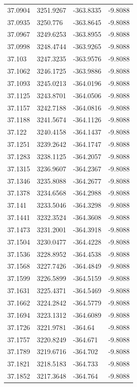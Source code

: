 \begin{table}[H]
\begin{tabular}{llll}
37.0904 & 3251.9267 & -363.8335 & -9.8088 \\
37.0935 & 3250.776 & -363.8645 & -9.8088 \\
37.0967 & 3249.6253 & -363.8955 & -9.8088 \\
37.0998 & 3248.4744 & -363.9265 & -9.8088 \\
37.103 & 3247.3235 & -363.9576 & -9.8088 \\
37.1062 & 3246.1725 & -363.9886 & -9.8088 \\
37.1093 & 3245.0213 & -364.0196 & -9.8088 \\
37.1125 & 3243.8701 & -364.0506 & -9.8088 \\
37.1157 & 3242.7188 & -364.0816 & -9.8088 \\
37.1188 & 3241.5674 & -364.1126 & -9.8088 \\
37.122 & 3240.4158 & -364.1437 & -9.8088 \\
37.1251 & 3239.2642 & -364.1747 & -9.8088 \\
37.1283 & 3238.1125 & -364.2057 & -9.8088 \\
37.1315 & 3236.9607 & -364.2367 & -9.8088 \\
37.1346 & 3235.8088 & -364.2677 & -9.8088 \\
37.1378 & 3234.6568 & -364.2988 & -9.8088 \\
37.141 & 3233.5046 & -364.3298 & -9.8088 \\
37.1441 & 3232.3524 & -364.3608 & -9.8088 \\
37.1473 & 3231.2001 & -364.3918 & -9.8088 \\
37.1504 & 3230.0477 & -364.4228 & -9.8088 \\
37.1536 & 3228.8952 & -364.4538 & -9.8088 \\
37.1568 & 3227.7426 & -364.4849 & -9.8088 \\
37.1599 & 3226.5899 & -364.5159 & -9.8088 \\
37.1631 & 3225.4371 & -364.5469 & -9.8088 \\
37.1662 & 3224.2842 & -364.5779 & -9.8088 \\
37.1694 & 3223.1312 & -364.6089 & -9.8088 \\
37.1726 & 3221.9781 & -364.64 & -9.8088 \\
37.1757 & 3220.8249 & -364.671 & -9.8088 \\
37.1789 & 3219.6716 & -364.702 & -9.8088 \\
37.1821 & 3218.5183 & -364.733 & -9.8088 \\
37.1852 & 3217.3648 & -364.764 & -9.8088 \\

\end{tabular}
\end{table}
